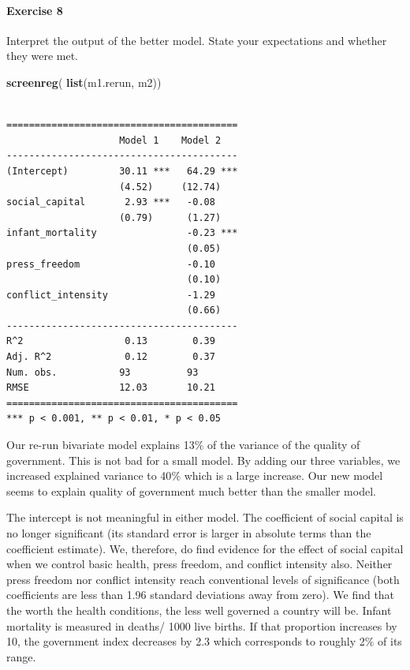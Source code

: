 \documentclass[]{article}
\newenvironment{Shaded}{\begin{snugshade}}{\end{snugshade}}
\newcommand{\KeywordTok}[1]{\textcolor[rgb]{0.13,0.29,0.53}{\textbf{#1}}}
\newcommand{\NormalTok}[1]{#1}
\let\oldparagraph\paragraph
\renewcommand{\paragraph}[1]{\oldparagraph{#1}\mbox{}}
\theoremstyle{definition}
\theoremstyle{definition}
\theoremstyle{definition}
\theoremstyle{remark}
\begin{document}
\paragraph{Exercise 8}\label{exercise-8-6}

Interpret the output of the better model. State your expectations and
whether they were met.

\begin{Shaded}
\begin{Highlighting}[]
\KeywordTok{screenreg}\NormalTok{( }\KeywordTok{list}\NormalTok{(m1.rerun, m2))}
\end{Highlighting}
\end{Shaded}

\begin{verbatim}

=========================================
                    Model 1    Model 2   
-----------------------------------------
(Intercept)         30.11 ***   64.29 ***
                    (4.52)     (12.74)   
social_capital       2.93 ***   -0.08    
                    (0.79)      (1.27)   
infant_mortality                -0.23 ***
                                (0.05)   
press_freedom                   -0.10    
                                (0.10)   
conflict_intensity              -1.29    
                                (0.66)   
-----------------------------------------
R^2                  0.13        0.39    
Adj. R^2             0.12        0.37    
Num. obs.           93          93       
RMSE                12.03       10.21    
=========================================
*** p < 0.001, ** p < 0.01, * p < 0.05
\end{verbatim}

Our re-run bivariate model explains 13\(\%\) of the variance of the
quality of government. This is not bad for a small model. By adding our
three variables, we increased explained variance to 40\(\%\) which is a
large increase. Our new model seems to explain quality of government
much better than the smaller model.

The intercept is not meaningful in either model. The coefficient of
social capital is no longer significant (its standard error is larger in
absolute terms than the coefficient estimate). We, therefore, do find
evidence for the effect of social capital when we control basic health,
press freedom, and conflict intensity also. Neither press freedom nor
conflict intensity reach conventional levels of significance (both
coefficients are less than 1.96 standard deviations away from zero). We
find that the worth the health conditions, the less well governed a
country will be. Infant mortality is measured in deaths/ 1000 live
births. If that proportion increases by 10, the government index
decreases by 2.3 which corresponds to roughly 2\(\%\) of its range.
\end{document}
